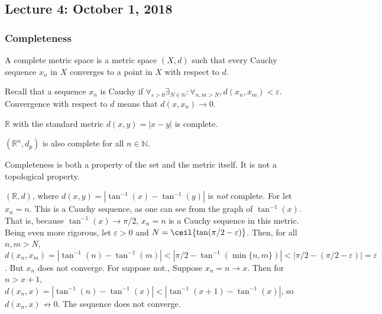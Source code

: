 \documentclass[crop=false,class=article,oneside]{standalone}
\begin{document}
    \subsection{Lecture 4: October 1, 2018}
        \subsubsection{Completeness}
            \begin{definition}
                A complete metric space is a metric
                space $(X,d)$ such that every
                Cauchy sequence $x_{n}$
                in $X$ converges to a point in $X$
                with respect to $d$.
            \end{definition}
            Recall that a sequence $x_{n}$ is Cauchy if
            $\forall_{\varepsilon>0}\exists_{N\in\mathbb{N}}:%
             \forall_{n,m>N},d(x_{n},x_{m})<\varepsilon$.
            Convergence with respect to $d$ means that
            $d(x,x_{n})\rightarrow{0}$.
            \begin{example}
                $\mathbb{R}$ with the standard metric
                $d(x,y)=|x-y|$ is complete.
            \end{example}
            \begin{example}
                $(\mathbb{R}^{n},d_{p})$ is also complete
                for all $n\in\mathbb{N}$.
            \end{example}
            Completeness is both a property of the set
            and the metric itself. It is not a topological
            property.
            \begin{example}
                $(\mathbb{R},d)$, where
                $d(x,y)=|\tan^{-1}(x)-\tan^{-1}(y)|$
                is \textit{not} complete. For let
                $x_{n}=n$. This is a Cauchy sequence,
                as one can see from the graph
                of $\tan^{-1}(x)$. That is, because
                $\tan^{-1}(x)\rightarrow{\pi/2}$,
                $x_{n}=n$ is a Cauchy sequence in this
                metric. Being even more rigorous, let
                $\varepsilon>0$ and
                $N=\ceil{\tan(\pi/2-\varepsilon)}$.
                Then, for all $n,m>N$,
                $d(x_{n},x_{m})%
                 =|\tan^{-1}(n)-\tan^{-1}(m)|%
                 <|\pi/2-\tan^{-1}(\min\{n,m\})|%
                 <|\pi/2-(\pi/2-\varepsilon)|%
                 =\varepsilon$. But $x_{n}$ does not
                converge. For suppose not.,
                Suppose $x_{n}=n\rightarrow{x}$.
                Then for $n>x+1$,
                $d(x_{n},x)=|\tan^{-1}(n)-\tan^{-1}(x)|%
                 <|\tan^{-1}(x+1)-\tan^{-1}(x)|$,
                so $d(x_{n},x)\not\rightarrow{0}$.
                The sequence does not converge.
            \end{example}
\end{document}
